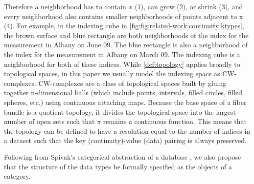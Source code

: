 \documentclass[journal]{IEEEtran}
\theoremstyle{definition}
\theoremstyle{remark}
\begin{document}
Therefore a neighborhood has to contain $x$ (1), can grow (2), or shrink (3), and every neighborhood also contains smaller neighborhoods of points adjacent to x (4). For example, in the indexing cube in \autoref{fig:fig:related-work:continuity:ktypes}, the brown surface and blue rectangle are both neighborhoods of the index for the measurement in Albany on June 09. The blue rectangle is also a neighborhood of the index for the measurement in Albany on March 09. The indexing cube is a neighborhood for both of these indices. While \autoref{def:topology} applies broadly to topological spaces, in this paper we usually model the indexing space as CW-complexes. CW-complexes are a class of topological spaces built by gluing together n-dimensional balls (which include points, intervals, filled circles, filled spheres, etc.) using continuous attaching maps. Because the base space of a fiber bundle is a quotient topology\cite{munkresElementsAlgebraicTopology1984}, it divides the topological space into the largest number of open sets such that $\pi$ remains a continuous function. This means that the topology can be defined to have a resolution equal to the number of indices in a dataset such that the key (continuity)-value (data) pairing is always preserved.

Following from Spivak's categorical abstraction of a database \cite{spivakSimplicialDatabases2009,spivakDatabasesAreCategories2010}, we also propose that the structure of the data types be formally specified as the objects of a category.
\end{document}
